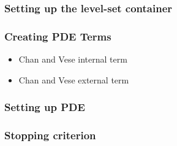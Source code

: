 \documentclass[18pt]{beamer}
\newcommand{\lstlistingwithnumber}[3]{
\begin{center}

\end{center}
}
\begin{document}
\begin{frame}
  \frametitle{Setting up the level-set container}
  \lstlistingwithnumber{129}{135}{SingleLevelSetWhitaker.cxx}
  \lstlistingwithnumber{137}{144}{SingleLevelSetWhitaker.cxx}
\end{frame}


\begin{frame}
  \frametitle{Creating PDE Terms}
  \begin{itemize}
    \item Chan and Vese internal term
    \lstlistingwithnumber{151}{158}{SingleLevelSetWhitaker.cxx}
    \item Chan and Vese external term
    \lstlistingwithnumber{162}{169}{SingleLevelSetWhitaker.cxx}
  \end{itemize}
\end{frame}


\begin{frame}
  \frametitle{Setting up PDE}
  \lstlistingwithnumber{174}{178}{SingleLevelSetWhitaker.cxx}
  \lstlistingwithnumber{180}{182}{SingleLevelSetWhitaker.cxx}
  \lstlistingwithnumber{184}{185}{SingleLevelSetWhitaker.cxx}
  \lstlistingwithnumber{188}{191}{SingleLevelSetWhitaker.cxx}
\end{frame}


\begin{frame}
  \frametitle{Stopping criterion}
  \lstlistingwithnumber{193}{196}{SingleLevelSetWhitaker.cxx}
\end{frame}

\end{document}
